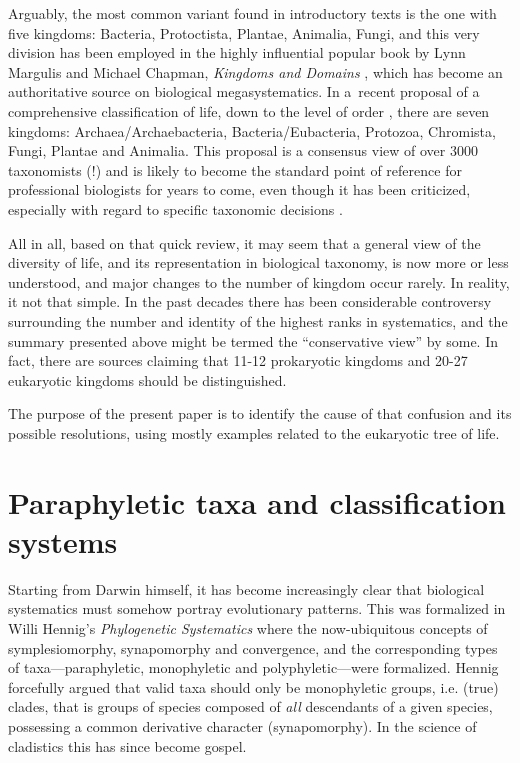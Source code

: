 \begin{artengenv}
Arguably, the most common variant found in introductory texts is the one with five kingdoms: Bacteria, Protoctista,
Plantae, Animalia, Fungi, and this very division has been employed in the highly influential popular book by Lynn
Margulis and Michael Chapman, \textit{Kingdoms and Domains}
\parencite{margulis_kingdoms_2009},
which has become an authoritative source on biological megasystematics. In a~recent proposal of a comprehensive
classification of life, down to the level of order
\parencite{ruggiero_higher_2015},
there are seven
kingdoms: Archaea/Archaebacteria, Bacteria/Eubacteria, Protozoa, Chromista, Fungi, Plantae and Animalia. This proposal
is a consensus view of over 3000 taxonomists (!) and is likely to become the standard point of reference for
professional biologists for years to come, even though it has been criticized, especially with regard to specific
taxonomic decisions
\parencite[e.g.][]{tedersoo_high-level_2018}.

All in all, based on that quick review, it may seem that a general view of the diversity of life, and its representation
in biological taxonomy, is now more or less understood, and major changes to the number of kingdom occur rarely. In
reality, it not that simple. In the past decades there has been considerable controversy surrounding the number and
identity of the highest ranks in systematics, and the summary presented above might be termed the ``conservative view''
by some. In fact, there are sources claiming that 11-12 prokaryotic kingdoms
\parencite{petitjean_rooting_2014}
and 20-27 eukaryotic kingdoms
\parencite{pawlowski_new_2013,tedersoo_proposal_2017}
should be
distinguished.

The purpose of the present paper is to identify the cause of that confusion and its possible resolutions, using mostly
examples related to the eukaryotic tree of life.

\section{Paraphyletic taxa and classification systems}

Starting from Darwin himself, it has become increasingly clear that biological systematics must somehow portray
evolutionary patterns. This was formalized in Willi Hennig’s \textit{Phylogenetic Systematics}
\parencite{hennig_phylogenetic_1966}
where the now-ubiquitous concepts of symplesiomorphy, synapomorphy and
convergence, and the corresponding types of taxa---paraphyletic, monophyletic and polyphyletic---were formalized.
Hennig forcefully argued that valid taxa should only be monophyletic groups, i.e. (true) clades, that is groups of
species composed of \textit{all} descendants of a given species, possessing a common derivative character
(synapomorphy). In the science of cladistics this has since become gospel.


\end{artengenv}
